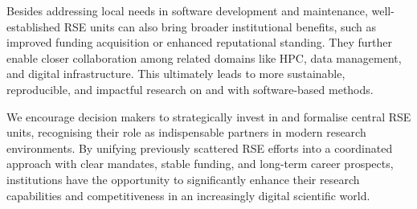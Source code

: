 \documentclass[a4paper]{article}
\begin{document}
Besides addressing local needs in software development and maintenance, well-established RSE units can also bring broader institutional benefits, such as improved funding acquisition or enhanced reputational standing.
They further enable closer collaboration among related domains like HPC, data management, and digital infrastructure.
This ultimately leads to more sustainable, reproducible, and impactful research on and with software-based methods.

We encourage decision makers to strategically invest in and formalise central RSE units, recognising their role as indispensable partners in modern research environments.
By unifying previously scattered RSE efforts into a coordinated approach with clear mandates, stable funding, and long-term career prospects, institutions have the opportunity to significantly enhance their research capabilities and competitiveness in an increasingly digital scientific world.


\printbibliography[heading=bibintoc]
\end{document}
